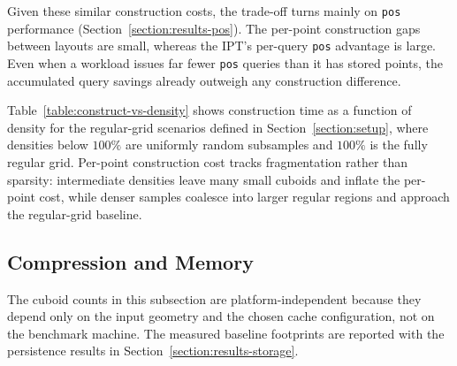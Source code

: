 \documentclass[manuscript,screen,review]{acmart}
\theoremstyle{definition}
\theoremstyle{plain}
\begin{document}
Given these similar construction costs, the trade-off turns mainly
on \texttt{pos} performance (Section~\ref{section:results-pos}). The
per-point construction gaps between layouts are small, whereas the
IPT's per-query \texttt{pos} advantage is large. Even when a workload
issues far fewer \texttt{pos} queries than it has stored points, the
accumulated query savings already outweigh any construction
difference.

Table~\ref{table:construct-vs-density} shows construction time as a
function of density for the regular-grid scenarios defined in
Section~\ref{section:setup}, where densities below $100\%$ are
uniformly random subsamples and $100\%$ is the fully regular grid.
Per-point construction cost tracks fragmentation rather than
sparsity: intermediate densities leave many small cuboids and inflate
the per-point cost, while denser samples coalesce into larger regular
regions and approach the regular-grid baseline.

\subsection{Compression and Memory}
\label{section:results-kappa}

The cuboid counts in this subsection are platform-independent because
they depend only on the input geometry and the chosen cache
configuration, not on the benchmark machine. The measured baseline
footprints are reported with the persistence results in
Section~\ref{section:results-storage}.

\begin{table}[ht]
\caption{Cuboid count and normalized cuboid count versus point-set
  density for the four grid-scenario extents from
  Section~\ref{section:setup}. The values are platform-independent
  because they depend only on the input geometry and construction
  algorithm. The left block reports the mean cuboid count $\kappa$, and
  the right block reports the mean normalized count $\kappa/N$. Densities
  below $100\%$ are uniformly random subsamples with 30-seed means.
  The $100\%$ row is the fully regular grid.}
\label{table:kappa-vs-density}

\end{table}
\end{document}
